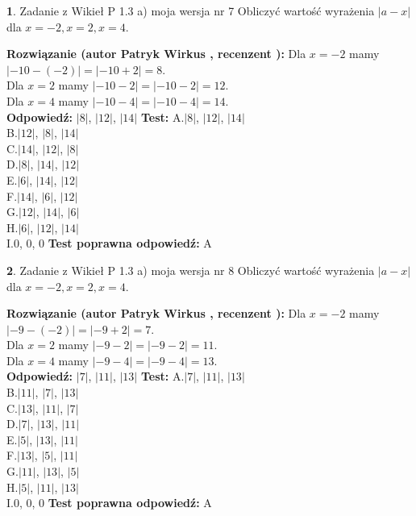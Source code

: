 \documentclass[12pt, a4paper]{article}
\theoremstyle{definition} %
\newtheorem{zad}{}
\newcommand{\zadStart}[1]{\begin{zad}#1\newline}
\newcommand{\zadStop}{\end{zad}}
\newcommand{\rozwStart}[2]{\noindent \textbf{Rozwiązanie (autor #1 , recenzent #2): }\newline}
\newcommand{\rozwStop}{\newline}
\newcommand{\odpStart}{\noindent \textbf{Odpowiedź:}\newline}
\newcommand{\odpStop}{\newline}
\newcommand{\testStart}{\noindent \textbf{Test:}\newline}
\newcommand{\testStop}{\newline}
\newcommand{\kluczStart}{\noindent \textbf{Test poprawna odpowiedź:}\newline}
\newcommand{\kluczStop}{\newline}
\begin{document}
\zadStart{Zadanie z Wikieł P 1.3 a) moja wersja nr 7}
Obliczyć wartość wyrażenia $|a - x|$ dla $x=-2,x=2,x=4$.
\zadStop
\rozwStart{Patryk Wirkus}{}
Dla $x = -2$ mamy $|-10 - (-2)| = |-10 + 2| = 8$.\\
Dla $x = 2$ mamy $|-10 - 2| = |-10 - 2| = 12$.\\
Dla $x = 4$ mamy $|-10 - 4| = |-10 - 4| = 14$.\\
\rozwStop
\odpStart
$|8|$, $|12|$, $|14|$
\odpStop
\testStart
A.$|8|$, $|12|$, $|14|$\\
B.$|12|$, $|8|$, $|14|$\\
C.$|14|$, $|12|$, $|8|$\\
D.$|8|$, $|14|$, $|12|$\\
E.$|6|$, $|14|$, $|12|$\\
F.$|14|$, $|6|$, $|12|$\\
G.$|12|$, $|14|$, $|6|$\\
H.$|6|$, $|12|$, $|14|$\\
I.$0$, $0$, $0$
\testStop
\kluczStart
A
\kluczStop



\zadStart{Zadanie z Wikieł P 1.3 a) moja wersja nr 8}
Obliczyć wartość wyrażenia $|a - x|$ dla $x=-2,x=2,x=4$.
\zadStop
\rozwStart{Patryk Wirkus}{}
Dla $x = -2$ mamy $|-9 - (-2)| = |-9 + 2| = 7$.\\
Dla $x = 2$ mamy $|-9 - 2| = |-9 - 2| = 11$.\\
Dla $x = 4$ mamy $|-9 - 4| = |-9 - 4| = 13$.\\
\rozwStop
\odpStart
$|7|$, $|11|$, $|13|$
\odpStop
\testStart
A.$|7|$, $|11|$, $|13|$\\
B.$|11|$, $|7|$, $|13|$\\
C.$|13|$, $|11|$, $|7|$\\
D.$|7|$, $|13|$, $|11|$\\
E.$|5|$, $|13|$, $|11|$\\
F.$|13|$, $|5|$, $|11|$\\
G.$|11|$, $|13|$, $|5|$\\
H.$|5|$, $|11|$, $|13|$\\
I.$0$, $0$, $0$
\testStop
\kluczStart
A
\kluczStop
\end{document}
